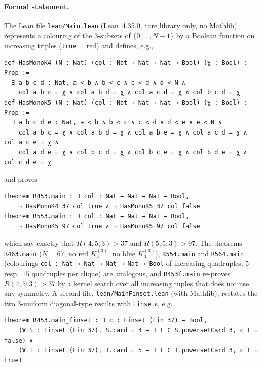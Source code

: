 \documentclass[11pt]{article}
\theoremstyle{definition}
\theoremstyle{remark}
\begin{document}
\paragraph{Formal statement.} The Lean file \texttt{lean/Main.lean} (Lean~4.35.0, core library only, no
Mathlib) represents a colouring of the $3$-subsets of $\{0,\dots,N-1\}$ by a Boolean function on increasing
triples (\texttt{true} = red) and defines, e.g.,
{\small\begin{verbatim}
def HasMonoK4 (N : Nat) (col : Nat → Nat → Nat → Bool) (χ : Bool) : Prop :=
  ∃ a b c d : Nat, a < b ∧ b < c ∧ c < d ∧ d < N ∧
    col a b c = χ ∧ col a b d = χ ∧ col a c d = χ ∧ col b c d = χ
def HasMonoK5 (N : Nat) (col : Nat → Nat → Nat → Bool) (χ : Bool) : Prop :=
  ∃ a b c d e : Nat, a < b ∧ b < c ∧ c < d ∧ d < e ∧ e < N ∧
    col a b c = χ ∧ col a b d = χ ∧ col a b e = χ ∧ col a c d = χ ∧ col a c e = χ ∧
    col a d e = χ ∧ col b c d = χ ∧ col b c e = χ ∧ col b d e = χ ∧ col c d e = χ
\end{verbatim}}
and proves
{\small\begin{verbatim}
theorem R453.main : ∃ col : Nat → Nat → Nat → Bool,
    ¬ HasMonoK4 37 col true ∧ ¬ HasMonoK5 37 col false
theorem R553.main : ∃ col : Nat → Nat → Nat → Bool,
    ¬ HasMonoK5 97 col true ∧ ¬ HasMonoK5 97 col false
\end{verbatim}}
which say exactly that $R(4,5;3)>37$ and $R(5,5;3)>97$. The theorems \texttt{R463.main} ($N=67$, no red
$K_4^{(3)}$, no blue $K_6^{(3)}$), \texttt{R554.main} and \texttt{R564.main} (colourings
\texttt{col : Nat → Nat → Nat → Nat → Bool} of increasing quadruples, $5$ resp.\ $15$ quadruples per clique)
are analogous, and \texttt{R453f.main} re-proves $R(4,5;3)>37$ by a kernel search over all increasing
tuples that does not use any symmetry. A second file, \texttt{lean/MainFinset.lean} (with Mathlib), restates the two
$3$-uniform diagonal-type results with \texttt{Finset}s, e.g.
{\small\begin{verbatim}
theorem R453.main_finset : ∃ c : Finset (Fin 37) → Bool,
    (∀ S : Finset (Fin 37), S.card = 4 → ∃ t ∈ S.powersetCard 3, c t = false) ∧
    (∀ T : Finset (Fin 37), T.card = 5 → ∃ t ∈ T.powersetCard 3, c t = true)
\end{verbatim}}
\end{document}
